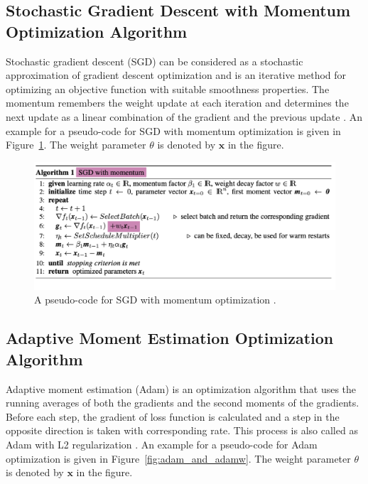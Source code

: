 \subsection{Stochastic Gradient Descent with Momentum  Optimization Algorithm}

Stochastic gradient descent (SGD) can be considered as a stochastic approximation of gradient descent optimization \cite{gradient_descent_algorithms} and is an iterative method for optimizing an objective function with suitable smoothness properties. The momentum remembers the weight update at each iteration and determines the next update as a linear combination of the gradient and the previous update \cite{SGD_Momentum}. An example for a pseudo-code for SGD with momentum optimization is given in Figure~\ref{fig:sgd_momentum}. The weight parameter $\theta$ is denoted by $\textbf{x}$ in the figure.

\begin{figure}[h]
	\centering
	\includegraphics[width=\linewidth]{fig/sgd_momentum.png}
	\caption{A pseudo-code for SGD with momentum optimization \cite{weight_decay_regularization}.}
	\label{fig:sgd_momentum}
\end{figure}

\subsection{Adaptive Moment Estimation Optimization Algorithm}

Adaptive moment estimation (Adam) is an optimization algorithm that uses the running averages of both the gradients and the second moments of the gradients. Before each step, the gradient of loss function is calculated and a step in the opposite direction is taken with corresponding rate. This process is also called as Adam with L2 regularization \cite{Adam}. An example for a pseudo-code for Adam optimization is given in Figure~\ref{fig:adam_and_adamw}. The weight parameter $\theta$ is denoted by $\textbf{x}$ in the figure.

